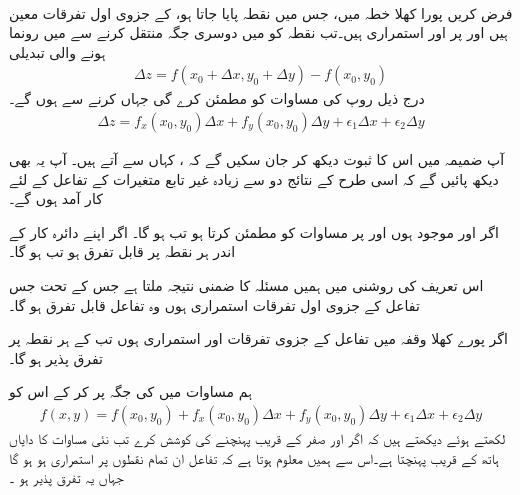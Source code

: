 \\
فرض کریں    پورا کھلا  خطہ  میں، جس میں نقطہ  پایا جاتا ہو،      کے    جزوی  اول تفرقات  معین  ہیں اور  پر  اور  استمراری ہیں۔تب نقطہ  کو  میں    دوسری جگہ   منتقل کرنے سے  میں رونما ہونے والی تبدیلی
\begin{align*}
\Delta z=f(x_0+\Delta x,y_0+\Delta y)-f(x_0,y_0)
\end{align*}
 درج ذیل روپ  کی مساوات کو مطمئن کرے گی جہاں   کرنے سے  ہوں  گے۔
\begin{align}\label{مساوات_کثیرالمتغیر_تفریق_تعریف_الف}
\Delta z=f_x(x_0,y_0)\Delta x+f_y(x_0,y_0)\Delta y+\epsilon_1\Delta x+\epsilon_2\Delta y
\end{align}

آپ ضمیمہ  میں  اس کا ثبوت  دیکھ کر جان سکیں گے کہ ،  کہاں سے آتے ہیں۔  آپ یہ بھی دیکھ پائیں گے کہ اسی طرح کے نتائج دو سے زیادہ  غیر تابع متغیرات کے تفاعل کے لئے کار آمد ہوں گے۔

اگر    اور   موجود ہوں اور  پر  مساوات   کو مطمئن کرتا ہو تب   ہو گا۔  اگر  اپنے دائرہ کار کے اندر ہر نقطہ پر قابل تفرق ہو تب  ہو گا۔

اس تعریف کی روشنی میں ہمیں مسئلہ  کا  ضمنی نتیجہ ملتا ہے جس کے تحت  جس تفاعل کے   جزوی اول   تفرقات استمراری ہوں وہ تفاعل قابل تفرق ہو گا۔

اگر پورے کھلا وقفہ  میں تفاعل  کے جزوی تفرقات  اور  استمراری ہوں تب  کے ہر نقطہ پر  تفرق پذیر ہو گا۔

  ہم مساوات  میں  کی جگہ  پر کر کے اس کو
\begin{align}\label{مساوات_کثیرالمتغیر_نقطہ_پر_تفاعل_کی_قیمت}
f(x,y)=f(x_0,y_0)+f_x(x_0,y_0)\Delta x+f_y(x_0,y_0)\Delta y+\epsilon_1\Delta x+\epsilon_2\Delta y
\end{align}
لکھتے ہوئے دیکھتے ہیں کہ   اگر  اور  صفر کے قریب پہنچنے کی کوشش کرے   تب نئی مساوات کا دایاں ہاتھ  کے قریب پہنچتا ہے۔اس سے ہمیں معلوم ہوتا ہے کہ تفاعل   ان تمام نقطوں پر  استمراری ہو  ہو گا جہاں یہ تفرق پذیر  ہو ۔

